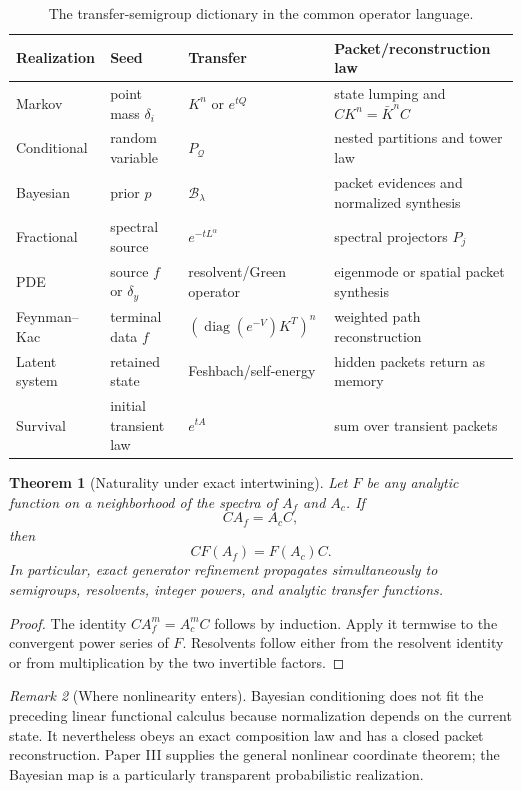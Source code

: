 \documentclass[11pt]{article}
\newtheorem{theorem}{Theorem}[section]
\theoremstyle{definition}
\theoremstyle{remark}
\newtheorem{remark}[theorem]{Remark}
\newcommand{\cB}{\mathcal B}
\newcommand{\diag}{\operatorname{diag}}
\begin{document}
\begin{table}[htbp]
\centering
\small
\begin{tabularx}{\textwidth}{L{0.17\textwidth} L{0.19\textwidth} Y Y}
\toprule
Realization & Seed & Transfer & Packet/reconstruction law\\
\midrule
Markov & point mass $\delta_i$ & $K^n$ or $e^{tQ}$ & state lumping and $CK^n=\bar K^nC$\\
Conditional & random variable & $P_{\mathcal Q}$ & nested partitions and tower law\\
Bayesian & prior $p$ & $\cB_\lambda$ & packet evidences and normalized synthesis\\
Fractional & spectral source & $e^{-tL^\alpha}$ & spectral projectors $P_j$\\
PDE & source $f$ or $\delta_y$ & resolvent/Green operator & eigenmode or spatial packet synthesis\\
Feynman--Kac & terminal data $f$ & $(\diag(e^{-V})K^T)^n$ & weighted path reconstruction\\
Latent system & retained state & Feshbach/self-energy & hidden packets return as memory\\
Survival & initial transient law & $e^{tA}$ & sum over transient packets\\
\bottomrule
\end{tabularx}
\caption{The transfer-semigroup dictionary in the common operator language.}
\label{tab:dictionary}
\end{table}

\begin{theorem}[Naturality under exact intertwining]
Let $F$ be any analytic function on a neighborhood of the spectra of $A_f$ and $A_c$. If
\[
CA_f=A_cC,
\]
then
\[
\boxed{CF(A_f)=F(A_c)C.}
\]
In particular, exact generator refinement propagates simultaneously to semigroups, resolvents, integer powers, and analytic transfer functions.
\end{theorem}

\begin{proof}
The identity $CA_f^m=A_c^mC$ follows by induction. Apply it termwise to the convergent power series of $F$. Resolvents follow either from the resolvent identity or from multiplication by the two invertible factors.
\end{proof}

\begin{remark}[Where nonlinearity enters]
Bayesian conditioning does not fit the preceding linear functional calculus because normalization depends on the current state. It nevertheless obeys an exact composition law and has a closed packet reconstruction. Paper III supplies the general nonlinear coordinate theorem; the Bayesian map is a particularly transparent probabilistic realization.
\end{remark}
\end{document}
